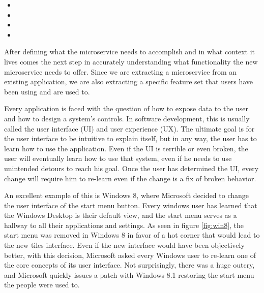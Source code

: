 \begin{itemize}
  \item {}
  \item {}
  \item {}
  \item {}
\end{itemize}

After defining what the microservice needs to accomplish and in what context it lives comes the next step in accurately understanding what functionality the new microservice needs to offer. Since we are extracting a microservice from an existing application, we are also extracting a specific feature set that users have been using and are used to.

Every application is faced with the question of how to expose data to the user and how to design a system's controls. In software development, this is usually called the user interface (UI) and user experience (UX). The ultimate goal is for the user interface to be intuitive to explain itself, but in any way, the user has to learn how to use the application. Even if the UI is terrible or even broken, the user will eventually learn how to use that system, even if he needs to use unintended detours to reach his goal. Once the user has determined the UI, every change will require him to re-learn even if the change is a fix of broken behavior.

An excellent example of this is Windows 8, where Microsoft decided to change the user interface of the start menu button. Every windows user has learned that the Windows Desktop is their default view, and the start menu serves as a hallway to all their applications and settings. As seen in figure \ref{fig:win8}, the start menu was removed in Windows 8 in favor of a hot corner that would lead to the new tiles interface. Even if the new interface would have been objectively better, with this decision, Microsoft asked every Windows user to re-learn one of the core concepts of its user interface. Not surprisingly, there was a huge outcry, and Microsoft quickly issues a patch with Windows 8.1 restoring the start menu the people were used to.

